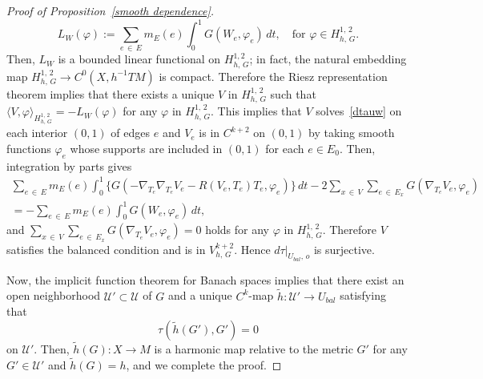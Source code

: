 \documentclass[11pt]{article}
\theoremstyle{definition}
\numberwithin{equation}{section}
\newcommand{\f}{\varphi}
\newcommand*\Uc{\mathcal{U}}
\newcommand*\wt{\widetilde}
\begin{document}
\begin{proof}[Proof of Proposition~\ref{smooth dependence}]
\[
L_W(\f):=\sum_{e\,\in\,E}m_E(e)\int_0^1 G\left(W_e, \f_e\right)\,dt, \quad \text{for }\f \in H^{1,\,2}_{h,\,G}.
\]
Then, $L_W$ is a bounded linear functional on $H^{1, 2}_{h,\,G}$; in fact, the natural embedding map $H^{1,\,2}_{h,\,G} \to C^0(X, h^{-1}TM)$ is compact. Therefore the Riesz representation theorem implies that there exists a unique $V$ in $H^{1,\,2}_{h,\,G}$ such that $\langle V, \f\rangle_{H_{h,\,G}^{1,\,2}}=-L_W(\f)$ for any $\f$ in $H^{1,\,2}_{h,\,G}$. This implies that $V$ solves~\eqref{dtauw} on each interior $(0, 1)$ of edges $e$ and $V_e$ is in $C^{k+2}$ on $(0, 1)$ by taking smooth functions $\f_e$ whose supports are included in $(0, 1)$ for each $e \in E_0$. Then, integration by parts gives
\begin{multline*}
\sum_{e\,\in\,E}m_E(e)\int_0^1\big\{G\left(-\nabla_{T_e}\nabla_{T_e}V_e-R\left(V_e, T_e\right)T_e, \f_e\right)\big\}\,dt -2\sum_{x\,\in\,V}\sum_{e\,\in\,E_x}G\left(\nabla_{T_e}V_e, \f_e\right)\\
=-\sum_{e\,\in\,E}m_E(e)\int_0^1 G\left(W_e, \f_e\right)\,dt,
\end{multline*}
and $\sum_{x\,\in\,V}\sum_{e\,\in\,E_x}G(\nabla_{T_e}V_e, \f_e)=0$ holds for any $\f$ in $H^{1,\,2}_{h,\,G}$. Therefore $V$ satisfies the balanced condition and is in $V_{h,\,G}^{k+2}$. Hence $d\tau|_{U_{bal},\,o}$ is surjective.



Now, the implicit function theorem for Banach spaces implies that there exist an open neighborhood $\Uc'\subset \Uc$ of $G$ and a unique $C^k$-map $\wt h: \Uc'\to U_{bal}$ satisfying that
\[
\tau\left(\wt h\left(G'\right),G'\right)=0
\]
on $\Uc'$. Then, $\wt h(G): X\to M$ is a harmonic map relative to the metric $G'$ for any $G' \in \Uc'$ and $\wt h(G)=h$, and we complete the proof.
\end{proof}
\end{document}
